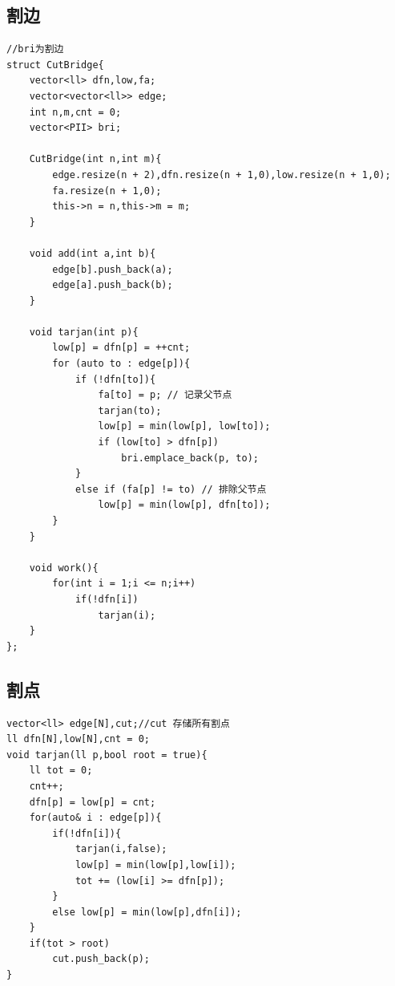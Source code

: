 \subsection{割边}
\begin{lstlisting}[caption={}]
//bri为割边
struct CutBridge{
    vector<ll> dfn,low,fa;
    vector<vector<ll>> edge;
    int n,m,cnt = 0;
    vector<PII> bri;  

    CutBridge(int n,int m){
        edge.resize(n + 2),dfn.resize(n + 1,0),low.resize(n + 1,0);
        fa.resize(n + 1,0);
        this->n = n,this->m = m;
    }

    void add(int a,int b){
        edge[b].push_back(a);
        edge[a].push_back(b);
    }

    void tarjan(int p){
        low[p] = dfn[p] = ++cnt;
        for (auto to : edge[p]){
            if (!dfn[to]){
                fa[to] = p; // 记录父节点
                tarjan(to);
                low[p] = min(low[p], low[to]);
                if (low[to] > dfn[p])
                    bri.emplace_back(p, to);
            }
            else if (fa[p] != to) // 排除父节点
                low[p] = min(low[p], dfn[to]);
        }
    }

    void work(){
        for(int i = 1;i <= n;i++)
            if(!dfn[i])
                tarjan(i);
    }
};
\end{lstlisting}

\subsection{割点}
\begin{lstlisting}[caption={}]
vector<ll> edge[N],cut;//cut 存储所有割点
ll dfn[N],low[N],cnt = 0;
void tarjan(ll p,bool root = true){
    ll tot = 0;
    cnt++;
    dfn[p] = low[p] = cnt;
    for(auto& i : edge[p]){
        if(!dfn[i]){
            tarjan(i,false);
            low[p] = min(low[p],low[i]);
            tot += (low[i] >= dfn[p]);
        }
        else low[p] = min(low[p],dfn[i]);
    }
    if(tot > root)
        cut.push_back(p);
}
\end{lstlisting}


